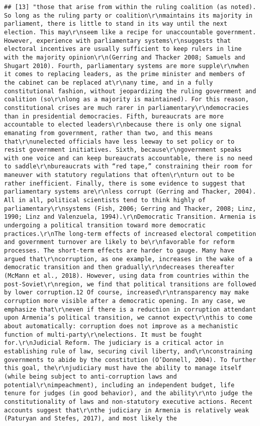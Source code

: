 \documentclass[
]{article}
\begin{document}
\begin{verbatim}
## [13] "those that arise from within the ruling coalition (as noted). So long as the ruling party or coalition\r\nmaintains its majority in parliament, there is little to stand in its way until the next election. This may\r\nseem like a recipe for unaccountable government. However, experience with parliamentary systems\r\nsuggests that electoral incentives are usually sufficient to keep rulers in line with the majority opinion\r\n(Gerring and Thacker 2008; Samuels and Shugart 2010). Fourth, parliamentary systems are more supple\r\nwhen it comes to replacing leaders, as the prime minister and members of the cabinet can be replaced at\r\nany time, and in a fully constitutional fashion, without jeopardizing the ruling government and coalition (so\r\nlong as a majority is maintained). For this reason, constitutional crises are much rarer in parliamentary\r\ndemocracies than in presidential democracies. Fifth, bureaucrats are more accountable to elected leaders\r\nbecause there is only one signal emanating from government, rather than two, and this means that\r\nunelected officials have less leeway to set policy or to resist government initiatives. Sixth, because\r\ngovernment speaks with one voice and can keep bureaucrats accountable, there is no need to saddle\r\nbureaucrats with “red tape,” constraining their room for maneuver with statutory regulations that often\r\nturn out to be rather inefficient. Finally, there is some evidence to suggest that parliamentary systems are\r\nless corrupt (Gerring and Thacker, 2004). All in all, political scientists tend to think highly of parliamentary\r\nsystems (Fish, 2006; Gerring and Thacker, 2008; Linz, 1990; Linz and Valenzuela, 1994).\r\nDemocratic Transition. Armenia is undergoing a political transition toward more democratic practices.\r\nThe long-term effects of increased electoral competition and government turnover are likely to be\r\nfavorable for reform processes. The short-term effects are harder to gauge. Many have argued that\r\ncorruption, as one example, increases in the wake of a democratic transition and then gradually\r\ndecreases thereafter (McMann et al., 2018). However, using data from countries within the post-Soviet\r\nregion, we find that political transitions are followed by lower corruption.12 Of course, increased\r\ntransparency may make corruption more visible after a democratic opening. In any case, we emphasize that\r\neven if there is a reduction in corruption attendant upon Armenia’s political transition, we cannot expect\r\nthis to come about automatically: corruption does not improve as a mechanistic function of multi-party\r\nelections. It must be fought for.\r\nJudicial Reform. The judiciary is a critical actor in establishing rule of law, securing civil liberty, and\r\nconstraining governments to abide by the constitution (O’Donnell, 2004). To further this goal, the\r\njudiciary must have the ability to manage itself (while being subject to anti-corruption laws and potential\r\nimpeachment), including an independent budget, life tenure for judges (in good behavior), and the ability\r\nto judge the constitutionality of laws and non-statutory executive actions. Recent accounts suggest that\r\nthe judiciary in Armenia is relatively weak (Paturyan and Stefes, 2017), and most likely the 
\end{verbatim}
\end{document}
